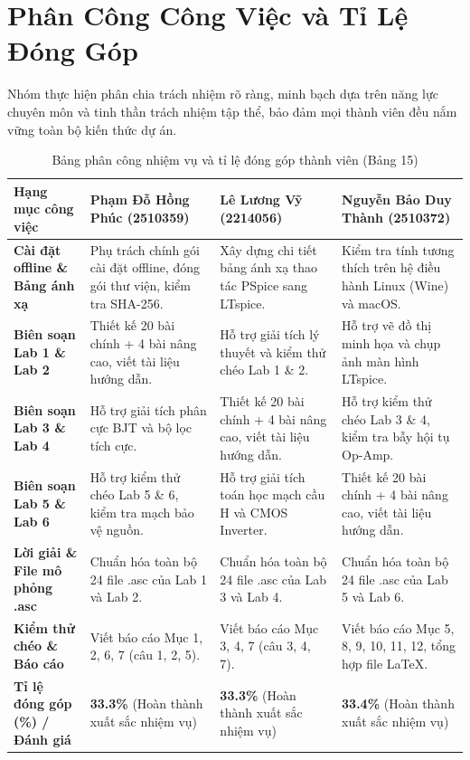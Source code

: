 \documentclass[12pt,a4paper]{report}
\begin{document}
\chapter{Phân Công Công Việc và Tỉ Lệ Đóng Góp}

Nhóm thực hiện phân chia trách nhiệm rõ ràng, minh bạch dựa trên năng lực chuyên môn và tinh thần trách nhiệm tập thể, bảo đảm mọi thành viên đều nắm vững toàn bộ kiến thức dự án.

\begin{table}[H]
\centering
\caption{Bảng phân công nhiệm vụ và tỉ lệ đóng góp thành viên (Bảng 15)}
\label{tab:phan_cong_nhiem_vu}
\renewcommand{\arraystretch}{1.3}
\begin{tabularx}{\textwidth}{|p{5.5cm}|X|X|X|}
\hline
\rowcolor{codebg}
\textbf{Hạng mục công việc} & \textbf{Phạm Đỗ Hồng Phúc (2510359)} & \textbf{Lê Lương Vỹ (2214056)} & \textbf{Nguyễn Bảo Duy Thành (2510372)} \\ \hline
\textbf{Cài đặt offline \& Bảng ánh xạ} & Phụ trách chính gói cài đặt offline, đóng gói thư viện, kiểm tra SHA-256. & Xây dựng chi tiết bảng ánh xạ thao tác PSpice sang LTspice. & Kiểm tra tính tương thích trên hệ điều hành Linux (Wine) và macOS. \\ \hline
\textbf{Biên soạn Lab 1 \& Lab 2} & Thiết kế 20 bài chính + 4 bài nâng cao, viết tài liệu hướng dẫn. & Hỗ trợ giải tích lý thuyết và kiểm thử chéo Lab 1 \& 2. & Hỗ trợ vẽ đồ thị minh họa và chụp ảnh màn hình LTspice. \\ \hline
\textbf{Biên soạn Lab 3 \& Lab 4} & Hỗ trợ giải tích phân cực BJT và bộ lọc tích cực. & Thiết kế 20 bài chính + 4 bài nâng cao, viết tài liệu hướng dẫn. & Hỗ trợ kiểm thử chéo Lab 3 \& 4, kiểm tra bẫy hội tụ Op-Amp. \\ \hline
\textbf{Biên soạn Lab 5 \& Lab 6} & Hỗ trợ kiểm thử chéo Lab 5 \& 6, kiểm tra mạch bảo vệ nguồn. & Hỗ trợ giải tích toán học mạch cầu H và CMOS Inverter. & Thiết kế 20 bài chính + 4 bài nâng cao, viết tài liệu hướng dẫn. \\ \hline
\textbf{Lời giải \& File mô phỏng .asc} & Chuẩn hóa toàn bộ 24 file .asc của Lab 1 và Lab 2. & Chuẩn hóa toàn bộ 24 file .asc của Lab 3 và Lab 4. & Chuẩn hóa toàn bộ 24 file .asc của Lab 5 và Lab 6. \\ \hline
\textbf{Kiểm thử chéo \& Báo cáo} & Viết báo cáo Mục 1, 2, 6, 7 (câu 1, 2, 5). & Viết báo cáo Mục 3, 4, 7 (câu 3, 4, 7). & Viết báo cáo Mục 5, 8, 9, 10, 11, 12, tổng hợp file LaTeX. \\ \hline
\hline
\rowcolor{codebg}
\textbf{Tỉ lệ đóng góp (\%) / Đánh giá} & \textbf{33.3\%} (Hoàn thành xuất sắc nhiệm vụ) & \textbf{33.3\%} (Hoàn thành xuất sắc nhiệm vụ) & \textbf{33.4\%} (Hoàn thành xuất sắc nhiệm vụ) \\ \hline
\end{tabularx}
\end{table}
\end{document}
